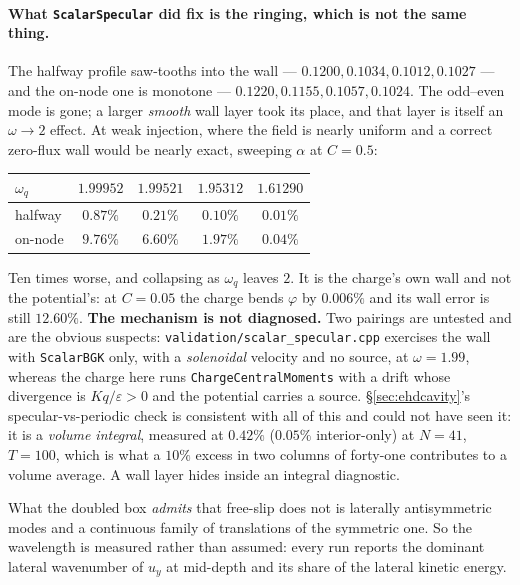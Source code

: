 \documentclass[11pt,a4paper]{article}
\newcommand{\code}[1]{\texttt{\small #1}}
\begin{document}
\paragraph{What \code{ScalarSpecular} did fix is the ringing, which is not the
same thing.} The halfway profile saw-tooths into the wall ---
$0.1200, 0.1034, 0.1012, 0.1027$ --- and the on-node one is monotone ---
$0.1220, 0.1155, 0.1057, 0.1024$. The odd--even mode is gone; a larger
\emph{smooth} wall layer took its place, and that layer is itself an
$\omega\to2$ effect. At weak injection, where the field is nearly uniform and a
correct zero-flux wall would be nearly exact, sweeping $\alpha$ at $C=0.5$:

\begin{center}\small
\begin{tabular}{lcccc}
\toprule
$\omega_q$ & $1.99952$ & $1.99521$ & $1.95312$ & $1.61290$ \\
\midrule
halfway & $0.87\%$ & $0.21\%$ & $0.10\%$ & $0.01\%$ \\
on-node & $9.76\%$ & $6.60\%$ & $1.97\%$ & $0.04\%$ \\
\bottomrule
\end{tabular}
\end{center}

\noindent Ten times worse, and collapsing as $\omega_q$ leaves $2$. It is the
charge's own wall and not the potential's: at $C=0.05$ the charge bends $\varphi$
by $0.006\%$ and its wall error is still $12.60\%$. \textbf{The mechanism is not
diagnosed.} Two pairings are untested and are the obvious suspects:
\code{validation/scalar\_specular.cpp} exercises the wall with \code{ScalarBGK}
only, with a \emph{solenoidal} velocity and no source, at $\omega=1.99$, whereas
the charge here runs \code{ChargeCentralMoments} with a drift whose divergence is
$Kq/\varepsilon>0$ and the potential carries a source.
\S\ref{sec:ehdcavity}'s specular-vs-periodic check is consistent with all of this
and could not have seen it: it is a \emph{volume integral}, measured at $0.42\%$
($0.05\%$ interior-only) at $N=41$, $T=100$, which is what a $10\%$ excess in two
columns of forty-one contributes to a volume average. A wall layer hides inside
an integral diagnostic.

What the doubled box \emph{admits} that free-slip does not is laterally
antisymmetric modes and a continuous family of translations of the symmetric one.
So the wavelength is measured rather than assumed: every run reports the dominant
lateral wavenumber of $u_y$ at mid-depth and its share of the lateral kinetic
energy.
\end{document}
